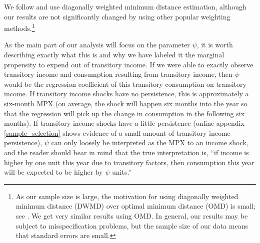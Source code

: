 \documentclass[titlepage]{\econtex}\newcommand{\texname}{ConsumptionHeterogeneity}
\begin{document}
	We follow \cite{blundell_consumption_2008} and use diagonally weighted minimum distance estimation, although our results are not significantly changed by using other popular weighting methods.\footnote{As our sample size is large, the motivation for using diagonally weighted minimum distance (DWMD) over optimal minimum distance (OMD) is small; see \cite{altonji_small-sample_1996}. We get very similar results using OMD. In general, our results may be subject to misspecification problems, but the sample size of our data means that standard errors are small.}
	
	As the main part of our analysis will focus on the parameter $\psi$, it is worth describing exactly what this is and why we have labeled it the marginal propensity to expend out of transitory income. If we were able to exactly observe transitory income and consumption resulting from transitory income, then $\psi$ would be the regression coefficient of this transitory consumption on transitory income. If transitory income shocks have no persistence, this is approximately a six-month MPX (on average, the shock will happen six months into the year so that the regression will pick up the change in consumption in the following six months). If transitory income shocks have a little persistence (online appendix \ref{sample_selection} shows evidence of a small amount of transitory income persistence), $\psi$ can only loosely be interpreted as the MPX to an income shock, and the reader should bear in mind that the true interpretation is, ``if income is higher by one unit this year due to transitory factors, then consumption this year will be expected to be higher by $\psi$ units.''
	
\end{document}
